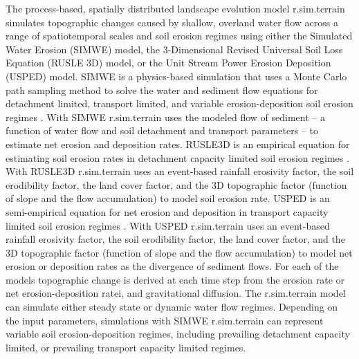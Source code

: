 \documentclass[gmd, manuscript]{copernicus}
\begin{document}
The process-based, spatially distributed 
landscape evolution model r.sim.terrain
simulates topographic changes
caused by shallow, overland water flow
across a range of spatiotemporal scales and soil erosion regimes
using either
the Simulated Water Erosion (SIMWE) model, 
the 3-Dimensional Revised Universal Soil Loss Equation (RUSLE 3D) model,
or the Unit Stream Power Erosion Deposition (USPED) model.  
SIMWE is a physics-based simulation
that uses a Monte Carlo path sampling method
to solve the water and sediment flow equations 
for detachment limited, transport limited, and variable erosion-deposition 
soil erosion regimes \citep{Mitas1998,Mitasova2004}. 
With SIMWE 
r.sim.terrain
uses the modeled flow of sediment 
-- a function of water flow and soil detachment and transport parameters -- 
to estimate net erosion and deposition rates. 
RUSLE3D is an empirical equation for estimating soil erosion rates
in detachment capacity limited soil erosion regimes \citep{Mitasova1996,Mitasova2013}. 
With RUSLE3D
r.sim.terrain
uses an event-based rainfall erosivity factor, 
the soil erodibility factor, the land cover factor, and the 3D topographic factor (function of slope and the flow accumulation)
to model soil erosion rate.
USPED is an semi-empirical equation for net erosion and deposition 
in transport capacity limited soil erosion regimes \citep{Mitasova1996,Mitasova2013}. 
With USPED 
r.sim.terrain
uses an event-based rainfall erosivity factor, 
the soil erodibility factor, the land cover factor, and the 3D topographic factor (function of slope and the flow accumulation)
to model net erosion or deposition rates as the divergence of sediment flows. 
For each of the models topographic change is derived at each time step
from the erosion rate or
net erosion-deposition ratei, and gravitational diffusion.
The r.sim.terrain model
can simulate either steady state or dynamic water flow regimes.
Depending on the input parameters, simulations with SIMWE 
r.sim.terrain
can represent variable soil erosion-deposition regimes, including prevailing  
detachment capacity limited, or prevailing transport capacity limited regimes.
\end{document}

